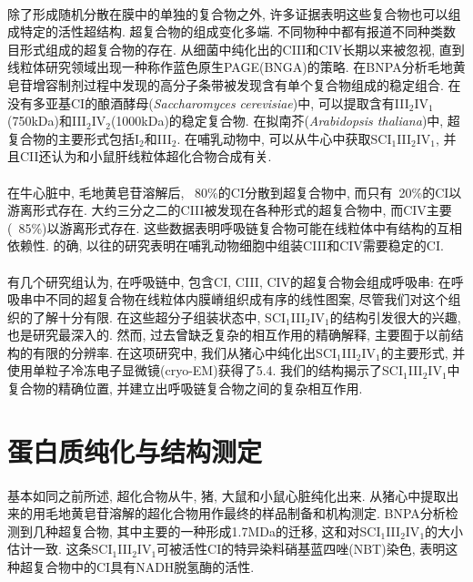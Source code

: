 \documentclass{article}
\begin{document}
  \paragraph{}
    除了形成随机分散在膜中的单独的复合物之外, 许多证据表明这些复合物也可以组成特定的活性超结构. 超复合物的组成变化多端. 不同物种中都有报道不同种类数目形式组成的超复合物的存在. 从细菌中纯化出的CIII和CIV长期以来被忽视, 直到线粒体研究领域出现一种称作蓝色原生PAGE(BNGA)的策略. 在BNPA分析毛地黄皂苷增容制剂过程中发现的高分子条带被发现含有单个复合物组成的稳定组合. 在没有多亚基CI的酿酒酵母(\textit{Saccharomyces cerevisiae})中, 可以提取含有III$_{2}$IV$_{1}$(750kDa)和III$_{2}$IV$_{2}$(1000kDa)的稳定复合物. 在拟南芥(\textit{Arabidopsis thaliana})中, 超复合物的主要形式包括I$_{2}$和III$_{2}$. 在哺乳动物中, 可以从牛心中获取SCI$_{1}$III$_{2}$IV$_{1}$, 并且CII还认为和小鼠肝线粒体超化合物合成有关.
  \paragraph{}
    在牛心脏中, 毛地黄皂苷溶解后, ~80\%的CI分散到超复合物中, 而只有~20\%的CI以游离形式存在. 大约三分之二的CIII被发现在各种形式的超复合物中, 而CIV主要(~85\%)以游离形式存在. 这些数据表明呼吸链复合物可能在线粒体中有结构的互相依赖性. 的确, 以往的研究表明在哺乳动物细胞中组装CIII和CIV需要稳定的CI.
  \paragraph{}
    有几个研究组认为, 在呼吸链中, 包含CI, CIII, CIV的超复合物会组成呼吸串: 在呼吸串中不同的超复合物在线粒体内膜嵴组织成有序的线性图案, 尽管我们对这个组织的了解十分有限. 在这些超分子组装状态中, SCI$_{1}$III$_{2}$IV$_{1}$的结构引发很大的兴趣, 也是研究最深入的. 然而, 过去曾缺乏复杂的相互作用的精确解释, 主要囿于以前结构的有限的分辨率. 在这项研究中, 我们从猪心中纯化出SCI$_{1}$III$_{2}$IV$_{1}$的主要形式, 并使用单粒子冷冻电子显微镜(cryo-EM)获得了5.4. 我们的结构揭示了SCI$_{1}$III$_{2}$IV$_{1}$中复合物的精确位置, 并建立出呼吸链复合物之间的复杂相互作用.

\section{蛋白质纯化与结构测定}
  \paragraph{}
    基本如同之前所述, 超化合物从牛, 猪, 大鼠和小鼠心脏纯化出来. 从猪心中提取出来的用毛地黄皂苷溶解的超化合物用作最终的样品制备和机构测定. BNPA分析检测到几种超复合物, 其中主要的一种形成1.7MDa的迁移, 这和对SCI$_{1}$III$_{2}$IV$_{1}$的大小估计一致. 这条SCI$_{1}$III$_{2}$IV$_{1}$可被活性CI的特异染料硝基蓝四唑(NBT)染色, 表明这种超复合物中的CI具有NADH脱氢酶的活性.
\end{document}
